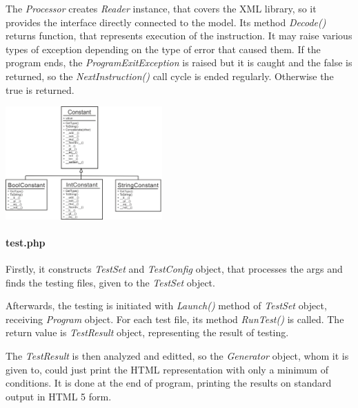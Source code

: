 \documentclass[10pt,a4paper,titlepage]{article}
\begin{document}
The {\it Processor} creates {\it Reader} instance, that covers the XML library,
so it provides the interface directly connected to the model. Its method
{\it Decode()} returns function, that represents execution of the instruction.
It may raise various types of exception depending on the type of error that
caused them. If the program ends, the {\it ProgramExitException} is raised
but it is caught and the false is returned, so the {\it NextInstruction()} call
cycle is ended regularly. Otherwise the true is returned.






\begin{multicols}{2}
\includegraphics[width=0.45\textwidth]{interpret_constant.png}

\end{multicols}



\paragraph{test.php}
Firstly, it constructs {\it TestSet} and {\it TestConfig} object, that processes
the args and finds the testing files, given to the {\it TestSet} object.

Afterwards, the testing is initiated with {\it Launch()} method of
{\it TestSet} object, receiving {\it Program} object. For each test file,
its method {\it RunTest()} is called. The return value is {\it TestResult}
object, representing the result of testing.

The {\it TestResult} is then analyzed and editted, so the {\it Generator}
object, whom it is given to, could just print the HTML representation with only
a minimum of conditions. It is done at the end of program, printing the
results on standard output in HTML 5 form.
\end{document}
